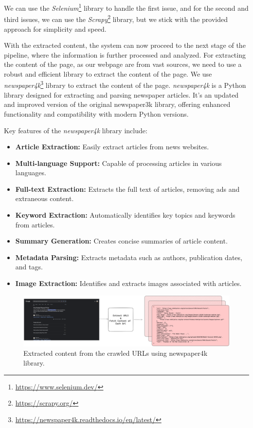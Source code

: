 We can use the \textit{Selenium}\footnote{\url{https://www.selenium.dev/}} library to handle the first issue, and for the second and third issues, we can use the \textit{Scrapy}\footnote{\url{https://scrapy.org/}} library, but we stick with the provided approach for simplicity and speed.

With the extracted content, the system can now proceed to the next stage of the pipeline, where the information is further processed and analyzed.
For extracting the content of the page, as our webpage are from vast sources, we need to use a robust and efficient library to extract the content of the page.
We use \textit{newspaper4k}\footnote{\url{https://newspaper4k.readthedocs.io/en/latest/}} library to extract the content of the page.
\textit{newspaper4k} is a Python library designed for extracting and parsing newspaper articles. It's an updated and improved version of the original newspaper3k library, offering enhanced functionality and compatibility with modern Python versions.

Key features of the \textit{newspaper4k} library include:
\begin{itemize}
    \item \textbf{Article Extraction:} Easily extract articles from news websites.
    \item \textbf{Multi-language Support:} Capable of processing articles in various languages.
    \item \textbf{Full-text Extraction:} Extracts the full text of articles, removing ads and extraneous content.
    \item \textbf{Keyword Extraction:} Automatically identifies key topics and keywords from articles.
    \item \textbf{Summary Generation:} Creates concise summaries of article content.
    \item \textbf{Metadata Parsing:} Extracts metadata such as authors, publication dates, and tags.
    \item \textbf{Image Extraction:} Identifies and extracts images associated with articles.
\end{itemize}

\begin{figure}[ht!]
    \centering
    \begin{minipage}[b]{\textwidth}
        \centering
        \includegraphics[width=\textwidth]{res/Google-Search-Result-Content}
    \end{minipage}
    \caption{Extracted content from the crawled URLs using newspaper4k library.}
    \label{fig:google-search-result-content}
\end{figure}

